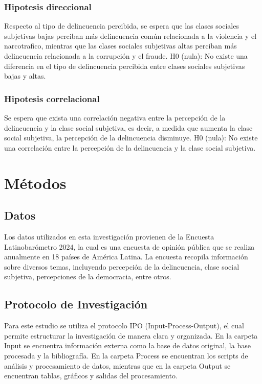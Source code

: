\documentclass[
  spanish,
  a4paper,
  oneside]{scrbook}
\begin{document}
\subsection{Hipotesis direccional}\label{hipotesis-direccional}

Respecto al tipo de delincuencia percibida, se espera que las clases
sociales subjetivas bajas perciban más delincuencia común relacionada a
la violencia y el narcotrafico, mientras que las clases sociales
subjetivas altas perciban más delincuencia relacionada a la corrupción y
el fraude. H0 (nula): No existe una diferencia en el tipo de
delincuencia percibida entre clases sociales subjetivas bajas y altas.

\subsection{Hipotesis correlacional}\label{hipotesis-correlacional}

Se espera que exista una correlación negativa entre la percepción de la
delincuencia y la clase social subjetiva, es decir, a medida que aumenta
la clase social subjetiva, la percepción de la delincuencia disminuye.
H0 (nula): No existe una correlación entre la percepción de la
delincuencia y la clase social subjetiva.


\chapter{Métodos}\label{muxe9todos}

\section{Datos}\label{datos}

Los datos utilizados en esta investigación provienen de la Encuesta
Latinobarómetro 2024, la cual es una encuesta de opinión pública que se
realiza anualmente en 18 países de América Latina. La encuesta recopila
información sobre diversos temas, incluyendo percepción de la
delincuencia, clase social subjetiva, percepciones de la democracia,
entre otros.

\section{Protocolo de
Investigación}\label{protocolo-de-investigaciuxf3n}

Para este estudio se utiliza el protocolo IPO (Input-Process-Output), el
cual permite estructurar la investigación de manera clara y organizada.
En la carpeta Input se encuentra información externa como la base de
datos original, la base procesada y la bibliografía. En la carpeta
Process se encuentran los scripts de análisis y procesamiento de datos,
mientras que en la carpeta Output se encuentran tablas, gráficos y
salidas del procesamiento.
\end{document}

